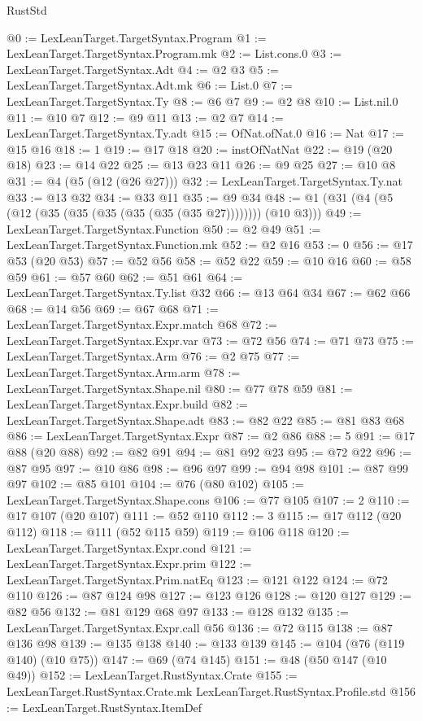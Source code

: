\begin{lexlean}{RustStd}
\begin{coremodule}
@0 := LexLeanTarget.TargetSyntax.Program
@1 := LexLeanTarget.TargetSyntax.Program.mk
@2 := List.cons.{0}
@3 := LexLeanTarget.TargetSyntax.Adt
@4 := @2 @3
@5 := LexLeanTarget.TargetSyntax.Adt.mk
@6 := List.{0}
@7 := LexLeanTarget.TargetSyntax.Ty
@8 := @6 @7
@9 := @2 @8
@10 := List.nil.{0}
@11 := @10 @7
@12 := @9 @11
@13 := @2 @7
@14 := LexLeanTarget.TargetSyntax.Ty.adt
@15 := OfNat.ofNat.{0}
@16 := Nat
@17 := @15 @16
@18 := 1
@19 := @17 @18
@20 := instOfNatNat
@22 := @19 (@20 @18)
@23 := @14 @22
@25 := @13 @23 @11
@26 := @9 @25
@27 := @10 @8
@31 := @4 (@5 (@12 (@26 @27)))
@32 := LexLeanTarget.TargetSyntax.Ty.nat
@33 := @13 @32
@34 := @33 @11
@35 := @9 @34
@48 := @1 (@31 (@4 (@5 (@12 (@35 (@35 (@35 (@35 (@35 (@35 @27)))))))) (@10 @3)))
@49 := LexLeanTarget.TargetSyntax.Function
@50 := @2 @49
@51 := LexLeanTarget.TargetSyntax.Function.mk
@52 := @2 @16
@53 := 0
@56 := @17 @53 (@20 @53)
@57 := @52 @56
@58 := @52 @22
@59 := @10 @16
@60 := @58 @59
@61 := @57 @60
@62 := @51 @61
@64 := LexLeanTarget.TargetSyntax.Ty.list @32
@66 := @13 @64 @34
@67 := @62 @66
@68 := @14 @56
@69 := @67 @68
@71 := LexLeanTarget.TargetSyntax.Expr.match @68
@72 := LexLeanTarget.TargetSyntax.Expr.var
@73 := @72 @56
@74 := @71 @73
@75 := LexLeanTarget.TargetSyntax.Arm
@76 := @2 @75
@77 := LexLeanTarget.TargetSyntax.Arm.arm
@78 := LexLeanTarget.TargetSyntax.Shape.nil
@80 := @77 @78 @59
@81 := LexLeanTarget.TargetSyntax.Expr.build
@82 := LexLeanTarget.TargetSyntax.Shape.adt
@83 := @82 @22
@85 := @81 @83 @68
@86 := LexLeanTarget.TargetSyntax.Expr
@87 := @2 @86
@88 := 5
@91 := @17 @88 (@20 @88)
@92 := @82 @91
@94 := @81 @92 @23
@95 := @72 @22
@96 := @87 @95
@97 := @10 @86
@98 := @96 @97
@99 := @94 @98
@101 := @87 @99 @97
@102 := @85 @101
@104 := @76 (@80 @102)
@105 := LexLeanTarget.TargetSyntax.Shape.cons
@106 := @77 @105
@107 := 2
@110 := @17 @107 (@20 @107)
@111 := @52 @110
@112 := 3
@115 := @17 @112 (@20 @112)
@118 := @111 (@52 @115 @59)
@119 := @106 @118
@120 := LexLeanTarget.TargetSyntax.Expr.cond
@121 := LexLeanTarget.TargetSyntax.Expr.prim
@122 := LexLeanTarget.TargetSyntax.Prim.natEq
@123 := @121 @122
@124 := @72 @110
@126 := @87 @124 @98
@127 := @123 @126
@128 := @120 @127
@129 := @82 @56
@132 := @81 @129 @68 @97
@133 := @128 @132
@135 := LexLeanTarget.TargetSyntax.Expr.call @56
@136 := @72 @115
@138 := @87 @136 @98
@139 := @135 @138
@140 := @133 @139
@145 := @104 (@76 (@119 @140) (@10 @75))
@147 := @69 (@74 @145)
@151 := @48 (@50 @147 (@10 @49))
@152 := LexLeanTarget.RustSyntax.Crate
@155 := LexLeanTarget.RustSyntax.Crate.mk LexLeanTarget.RustSyntax.Profile.std
@156 := LexLeanTarget.RustSyntax.ItemDef

\end{coremodule}
\end{lexlean}
